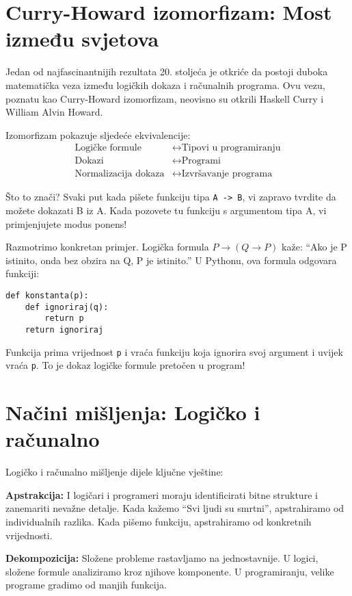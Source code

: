\section*{Curry-Howard izomorfizam: Most između svjetova}

Jedan od najfascinantnijih rezultata 20. stoljeća je otkriće da postoji duboka matematička veza između logičkih dokaza i računalnih programa. Ovu vezu, poznatu kao Curry-Howard izomorfizam, neovisno su otkrili Haskell Curry i William Alvin Howard.

Izomorfizam pokazuje sljedeće ekvivalencije:
\begin{align}
\text{Logičke formule} &\leftrightarrow \text{Tipovi u programiranju}\\
\text{Dokazi} &\leftrightarrow \text{Programi}\\
\text{Normalizacija dokaza} &\leftrightarrow \text{Izvršavanje programa}
\end{align}

Što to znači? Svaki put kada pišete funkciju tipa \texttt{A -> B}, vi zapravo tvrdite da možete dokazati B iz A. Kada pozovete tu funkciju s argumentom tipa A, vi primjenjujete modus ponens!

Razmotrimo konkretan primjer. Logička formula $P \rightarrow (Q \rightarrow P)$ kaže: ``Ako je P istinito, onda bez obzira na Q, P je istinito.'' U Pythonu, ova formula odgovara funkciji:
\begin{verbatim}
def konstanta(p):
    def ignoriraj(q):
        return p
    return ignoriraj
\end{verbatim}

Funkcija prima vrijednost \texttt{p} i vraća funkciju koja ignorira svoj argument i uvijek vraća \texttt{p}. To je dokaz logičke formule pretočen u program!

\section*{Načini mišljenja: Logičko i računalno}

Logičko i računalno mišljenje dijele ključne vještine:

\textbf{Apstrakcija:} I logičari i programeri moraju identificirati bitne strukture i zanemariti nevažne detalje. Kada kažemo ``Svi ljudi su smrtni'', apstrahiramo od individualnih razlika. Kada pišemo funkciju, apstrahiramo od konkretnih vrijednosti.

\textbf{Dekompozicija:} Složene probleme rastavljamo na jednostavnije. U logici, složene formule analiziramo kroz njihove komponente. U programiranju, velike programe gradimo od manjih funkcija.

